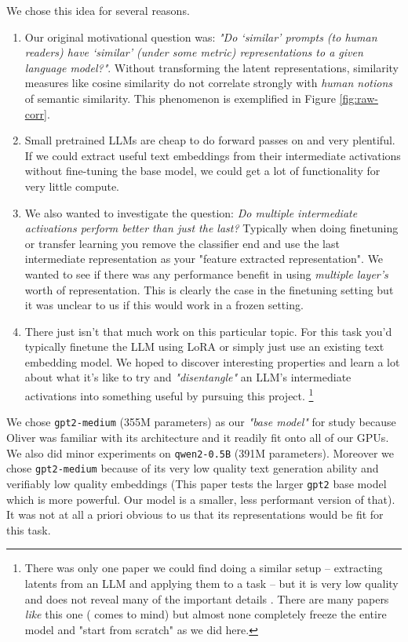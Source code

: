 \documentclass{article}
\begin{document}
We chose this idea for several reasons.
\begin{enumerate}
    \item Our original motivational question was: \textit{"Do ‘similar’ prompts (to human readers) have ‘similar’ (under some metric) representations to a given language model?"}. Without transforming the latent representations, similarity measures like cosine similarity do not correlate strongly with \textit{human notions} of semantic similarity. This phenomenon is exemplified in Figure \ref{fig:raw-corr}.

    \item Small pretrained LLMs are cheap to do forward passes on and very plentiful. If we could extract useful text embeddings from their intermediate activations without fine-tuning the base model, we could get a lot of functionality for very little compute.

    \item We also wanted to investigate the question: \textit{Do multiple intermediate activations perform better than just the last?} Typically when doing finetuning or transfer learning you remove the classifier end and use the last intermediate representation as your "feature extracted representation". We wanted to see if there was any performance benefit in using \textit{multiple layer's} worth of representation. This is clearly the case in the finetuning setting \cite{tang2024poolingattentioneffectivedesigns} but it was unclear to us if this would work in a frozen setting.
    
    \item There just isn't that much work on this particular topic. For this task you'd typically finetune the LLM using LoRA \cite{hu2021loralowrankadaptationlarge} or simply just use an existing text embedding model. We hoped to discover interesting properties and learn a lot about what it's like to try and \textit{"disentangle"} an LLM's intermediate activations into something useful by pursuing this project. \footnote{There was only one paper we could find doing a similar setup -- extracting latents from an LLM and applying them to a task -- but it is very low quality and does not reveal many of the important details \cite{gpt2malware}. There are many papers \textit{like} this one (\cite{lu2021pretrainedtransformersuniversalcomputation} comes to mind) but almost none completely freeze the entire model and "start from scratch" as we did here.}
    
\end{enumerate}
We chose \verb|gpt2-medium| (355M parameters) as our \textit{"base model"} for study because Oliver was familiar with its architecture and it readily fit onto all of our GPUs. We also did minor experiments on \verb|qwen2-0.5B| (391M parameters). Moreover we chose \verb|gpt2-medium| because of its very low quality text generation ability and verifiably low quality embeddings \cite{ethayarajh2019contextualcontextualizedwordrepresentations} (This paper tests the larger \verb|gpt2| base model which is more powerful. Our model is a smaller, less performant version of that). It was not at all a priori obvious to us that its representations would be fit for this task.
\end{document}
